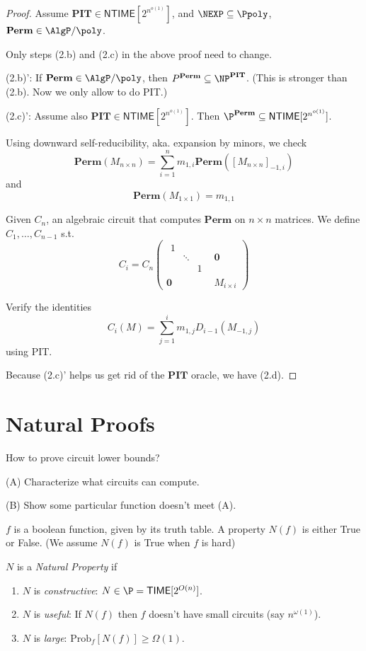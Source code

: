 \documentclass[letterpaper, 12pt]{article}
\newcommand{\Perm}{\mathbf{Perm}}
\newcommand{\PIT}{\mathbf{PIT}}
\newcommand{\Time}[1]{\mathsf{TIME}[#1]}
\newcommand{\NTime}[1]{\mathsf{NTIME}[#1]}
\newcommand{\Prob}[2]{\mathrm{Prob}_{#1}[#2]}
\newcommand{\subexp}{2^{n^{o(1)}}}
\begin{document}
\begin{proof}
	Assume $\PIT \in \NTime{\subexp}$, and $\NEXP \subseteq \Ppoly$, $\Perm \in \AlgP/\poly$.
	
	Only steps (2.b) and (2.c) in the above proof need to change.
	
	(2.b)': If $\Perm \in \AlgP/\poly$, then $P^\Perm \subseteq \NP^\PIT$. (This is stronger than (2.b). Now we only allow to do PIT.)
	
	(2.c)': Assume also $\PIT \in \NTime{\subexp}$. Then $\P^\Perm \subseteq \NTime{\subexp}$.
	
	Using downward self-reducibility, aka. expansion by minors, we check
	\[\Perm(M_{n\times n}) = \sum_{i = 1}^n m_{1,i} \Perm([M_{n\times n}]_{-1,i})\] 
	and
	\[\Perm(M_{1\times 1}) = m_{1,1}\]
	
	Given $C_n$, an algebraic circuit that computes $\Perm$ on $n \times n$ matrices. We define $C_1, \dots, C_{n-1}$ s.t. 
	\[C_i = C_n
	\left(
	\begin{array}{cc}
	\begin{matrix}
	1 & &\\
	& \ddots &\\
	& & 1
	\end{matrix} & \mathbf{0}\\
	\mathbf{0} & M_{i\times i}
	\end{array}
	\right)
	 \]
	
	Verify the identities
	\[C_i(M) = \sum_{j = 1}^i m_{1,j} D_{i-1}(M_{-1,j})\]
	using PIT.
	
	Because (2.c)' helps us get rid of the $\PIT$ oracle, we have (2.d).
\end{proof}

\section{Natural Proofs}

How to prove circuit lower bounds?

(A) Characterize what circuits can compute.

(B) Show some particular function doesn't meet (A).

\begin{definition}
$f$ is a boolean function, given by its truth table.
A property $N(f)$ is either True or False. (We assume $N(f)$ is True when $f$ is hard)

$N$ is a \emph{Natural Property} if
\begin{enumerate}
	\item $N$ is \emph{constructive}: $N \in \P = \Time{2^{O(n)}}$.
	\item $N$ is \emph{useful}: If $N(f)$ then $f$ doesn't have small circuits (say $n^{\omega(1)}$).
	\item $N$ is \emph{large}: $\Prob{f}{N(f)} \geq \Omega(1)$.
\end{enumerate}
\end{definition}
\end{document}

